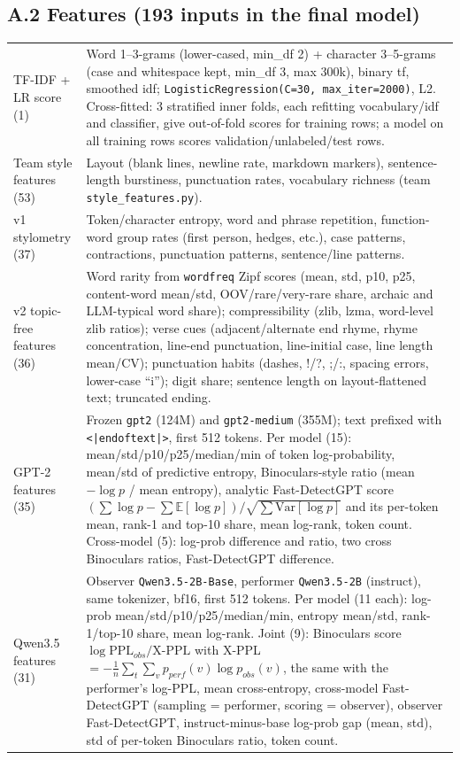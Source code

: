 \documentclass[11pt,letterpaper]{article}
\begin{document}
\subsection*{A.2 Features (193 inputs in the final model)}
\begin{tabularx}{\linewidth}{@{}p{1.55in}Y@{}}\toprule
TF-IDF + LR score (1) & Word 1--3-grams (lower-cased, min\_df 2) + character 3--5-grams (case and whitespace kept, min\_df 3, max 300k), binary tf, smoothed idf; \texttt{LogisticRegression(C=30, max\_iter=2000)}, L2. Cross-fitted: 3 stratified inner folds, each refitting vocabulary/idf and classifier, give out-of-fold scores for training rows; a model on all training rows scores validation/unlabeled/test rows. \\
Team style features (53) & Layout (blank lines, newline rate, markdown markers), sentence-length burstiness, punctuation rates, vocabulary richness (team \texttt{style\_features.py}). \\
v1 stylometry (37) & Token/character entropy, word and phrase repetition, function-word group rates (first person, hedges, etc.), case patterns, contractions, punctuation patterns, sentence/line patterns. \\
v2 topic-free features (36) & Word rarity from \texttt{wordfreq} Zipf scores (mean, std, p10, p25, content-word mean/std, OOV/rare/very-rare share, archaic and LLM-typical word share); compressibility (zlib, lzma, word-level zlib ratios); verse cues (adjacent/alternate end rhyme, rhyme concentration, line-end punctuation, line-initial case, line length mean/CV); punctuation habits (dashes, !/?, ;/:, spacing errors, lower-case ``i''); digit share; sentence length on layout-flattened text; truncated ending. \\
GPT-2 features (35) & Frozen \texttt{gpt2} (124M) and \texttt{gpt2-medium} (355M); text prefixed with \texttt{<|endoftext|>}, first 512 tokens. Per model (15): mean/std/p10/p25/median/min of token log-probability, mean/std of predictive entropy, Binoculars-style ratio (mean $-\log p$ / mean entropy), analytic Fast-DetectGPT score $(\sum \log p - \sum \mathbb{E}[\log p])/\sqrt{\sum \mathrm{Var}[\log p]}$ and its per-token mean, rank-1 and top-10 share, mean log-rank, token count. Cross-model (5): log-prob difference and ratio, two cross Binoculars ratios, Fast-DetectGPT difference. \\
Qwen3.5 features (31) & Observer \texttt{Qwen3.5-2B-Base}, performer \texttt{Qwen3.5-2B} (instruct), same tokenizer, bf16, first 512 tokens. Per model (11 each): log-prob mean/std/p10/p25/median/min, entropy mean/std, rank-1/top-10 share, mean log-rank. Joint (9): Binoculars score $\log\mathrm{PPL}_{obs}/\text{X-PPL}$ with X-PPL $=-\frac1n\sum_t\sum_v p_{perf}(v)\log p_{obs}(v)$, the same with the performer's log-PPL, mean cross-entropy, cross-model Fast-DetectGPT (sampling = performer, scoring = observer), observer Fast-DetectGPT, instruct-minus-base log-prob gap (mean, std), std of per-token Binoculars ratio, token count. \\

\end{tabularx}
\end{document}
